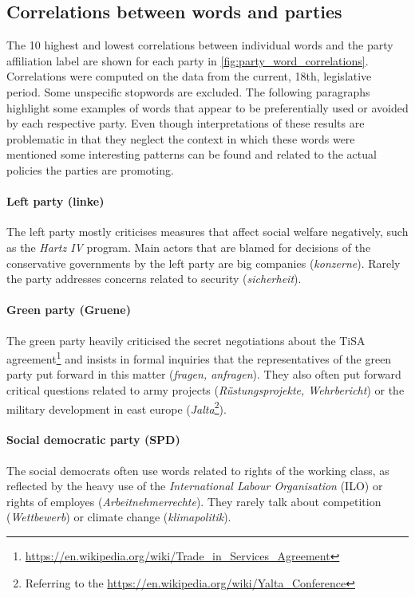 \documentclass[runningheads,a4paper]{llncs}
\begin{document}
\subsection{Correlations between words and parties}\label{sec:word_party_correlations}

The 10 highest and lowest correlations between individual words and the party affiliation label are shown for each party in \autoref{fig:party_word_correlations}. Correlations were computed on the data from the current, 18th, legislative period. Some unspecific stopwords are excluded. 
The following paragraphs highlight some examples of words that appear to be preferentially used or avoided by each respective party. Even though interpretations of these results are problematic in that they neglect the context in which these words were mentioned some interesting patterns can be found and related to the actual policies the parties are promoting. 

\paragraph{\bf Left party (linke)}
The left party mostly criticises measures that affect social welfare negatively, such as the {\em Hartz IV} program. Main actors that are blamed for decisions of the conservative governments by the left party are big companies ({\em konzerne}). Rarely the party addresses concerns related to security ({\em sicherheit}). 

\paragraph{\bf Green party (Gruene)}
The green party heavily criticised the secret negotiations about the TiSA agreement\footnote{\url{https://en.wikipedia.org/wiki/Trade_in_Services_Agreement}} and insists in formal inquiries that the representatives of the green party put forward in this matter ({\em fragen, anfragen}). They also often put forward critical questions related to army projects ({\em R\"ustungsprojekte, Wehrbericht}) or the military development in east europe ({\em  Jalta}\footnote{Referring to the \url{https://en.wikipedia.org/wiki/Yalta_Conference}}).

\paragraph{\bf Social democratic party (SPD)}
The social democrats often use words related to rights of the working class, as reflected by the heavy use of the {\em International Labour Organisation} (ILO) or rights of employes ({\em Arbeitnehmerrechte}). They rarely talk about competition ({\em Wettbewerb}) or climate change ({\em klimapolitik}). 
\end{document}

